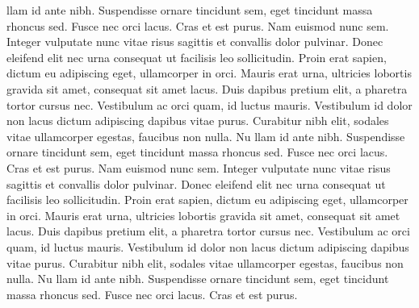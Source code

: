 \documentclass{article}
\begin{document}
\begin{multicols*}{2}
llam id ante nibh. Suspendisse ornare tincidunt sem, eget tincidunt massa rhoncus sed. Fusce nec orci lacus. Cras et est purus.
Nam euismod nunc sem. Integer vulputate nunc vitae risus sagittis et convallis dolor pulvinar. Donec eleifend elit nec urna consequat ut facilisis leo sollicitudin. Proin erat sapien, dictum eu adipiscing eget, ullamcorper in orci. Mauris erat urna, ultricies lobortis gravida sit amet, consequat sit amet lacus. Duis dapibus pretium elit, a pharetra tortor cursus nec. Vestibulum ac orci quam, id luctus mauris. Vestibulum id dolor non lacus dictum adipiscing dapibus vitae purus. Curabitur nibh elit, sodales vitae ullamcorper egestas, faucibus non nulla. Nu
llam id ante nibh. Suspendisse ornare tincidunt sem, eget tincidunt massa rhoncus sed. Fusce nec orci lacus. Cras et est purus.
Nam euismod nunc sem. Integer vulputate nunc vitae risus sagittis et convallis dolor pulvinar. Donec eleifend elit nec urna consequat ut facilisis leo sollicitudin. Proin erat sapien, dictum eu adipiscing eget, ullamcorper in orci. Mauris erat urna, ultricies lobortis gravida sit amet, consequat sit amet lacus. Duis dapibus pretium elit, a pharetra tortor cursus nec. Vestibulum ac orci quam, id luctus mauris. Vestibulum id dolor non lacus dictum adipiscing dapibus vitae purus. Curabitur nibh elit, sodales vitae ullamcorper egestas, faucibus non nulla. Nu
llam id ante nibh. Suspendisse ornare tincidunt sem, eget tincidunt massa rhoncus sed. Fusce nec orci lacus. Cras et est purus.


\participation
\biosec


\end{multicols*}
\end{document}
